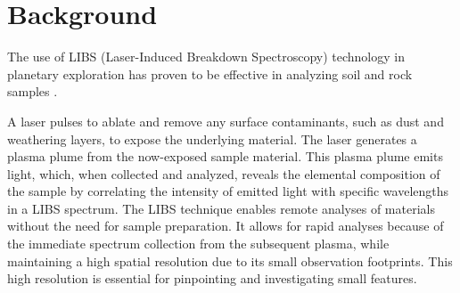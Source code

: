 \section{Background}\label{sec:background}
The use of LIBS (Laser-Induced Breakdown Spectroscopy) technology in planetary exploration has proven to be effective in analyzing soil and rock samples \citep{knight2000}.

A laser pulses to ablate and remove any surface contaminants, such as dust and weathering layers, to expose the underlying material.
The laser generates a plasma plume from the now-exposed sample material.
This plasma plume emits light, which, when collected and analyzed, reveals the elemental composition of the sample by correlating the intensity of emitted light with specific wavelengths in a LIBS spectrum.
The LIBS technique enables remote analyses of materials without the need for sample preparation.
It allows for rapid analyses because of the immediate spectrum collection from the subsequent plasma, while maintaining a high spatial resolution due to its small observation footprints.
This high resolution is essential for pinpointing and investigating small features. \cite{wiensChemcam2012}




